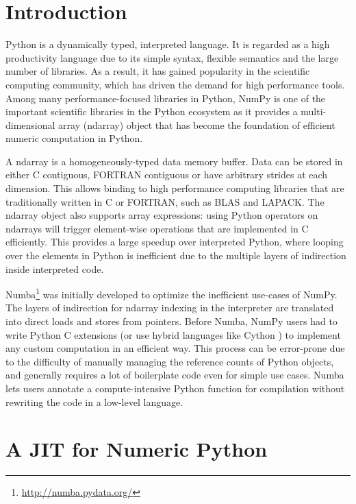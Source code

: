 \documentclass{sig-alternate}
\begin{document}


\section{Introduction}

Python is a dynamically typed, interpreted language.  It is regarded
as a high productivity language due to its simple syntax, flexible
semantics and the large number of libraries.  As a result, it has
gained popularity in the scientific computing
community\cite{oliphant:python}, which has driven the demand for high
performance tools.  Among many performance-focused libraries in
Python, NumPy\cite{vanderwalt:numpy} is one of the important
scientific libraries in the Python ecosystem as it provides a
multi-dimensional array (ndarray) object that has become the
foundation of efficient numeric computation in Python.

A ndarray is a homogeneously-typed data memory buffer.  Data can be
stored in either C contiguous, FORTRAN contiguous or have arbitrary
strides at each dimension.  This allows binding to high performance
computing libraries that are traditionally written in C or FORTRAN,
such as BLAS and LAPACK. The ndarray object also supports array
expressions: using Python operators on ndarrays will trigger
element-wise operations that are implemented in C efficiently.  This
provides a large speedup over interpreted Python, where looping over
the elements in Python is inefficient due to the multiple layers of
indirection inside interpreted code.

Numba\footnote{\url{http://numba.pydata.org/}} was initially
developed to optimize the inefficient use-cases of NumPy.  The layers
of indirection for ndarray indexing in the interpreter are translated
into direct loads and stores from pointers.  Before Numba, NumPy users
had to write Python C extensions (or use hybrid languages like Cython
\cite{behnel:cython}) to implement any custom computation in an
efficient way.  This process can be error-prone due to the difficulty
of manually managing the reference counts of Python objects, and
generally requires a lot of boilerplate code even for simple use
cases.  Numba lets users annotate a compute-intensive Python function
for compilation without rewriting the code in a low-level language.

\section{A JIT for Numeric Python}
\end{document}
